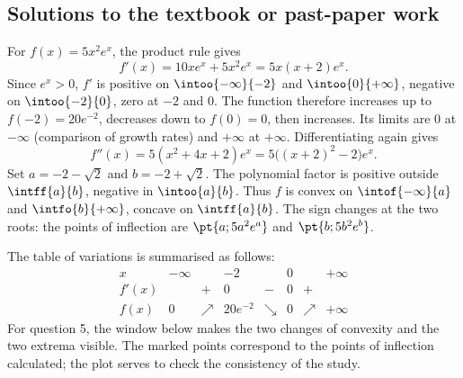 \subsection{Solutions to the textbook or past-paper work}For $f(x)=5x^2e^x$, the product rule gives
\[f'(x)=10xe^x+5x^2e^x=5x(x+2)e^x.\]
Since $e^x>0$, $f'$ is positive on $\intoo{-\infty}{-2}$ and $\intoo{0}{+\infty}$, negative on $\intoo{-2}{0}$, zero at $-2$ and $0$. The function therefore increases up to $f(-2)=20e^{-2}$, decreases down to $f(0)=0$, then increases. Its limits are $0$ at $-\infty$ (comparison of growth rates) and $+\infty$ at $+\infty$.
Differentiating again gives
\[f''(x)=5(x^2+4x+2)e^x=5\bigl((x+2)^2-2\bigr)e^x.\]
Set $a=-2-\sqrt2$ and $b=-2+\sqrt2$. The polynomial factor is positive outside $\intff{a}{b}$, negative in $\intoo{a}{b}$. Thus $f$ is convex on $\intof{-\infty}{a}$ and $\intfo{b}{+\infty}$, concave on $\intff{a}{b}$. The sign changes at the two roots: the points of inflection are $\pt{a;5a^2e^a}$ and $\pt{b;5b^2e^b}$.\par The table of variations is summarised as follows:
\[\begin{array}{c|ccccccc}x&-\infty&&-2&&0&&+\infty\\\hline f'(x)&&+&0&-&0&+&\\\hline f(x)&0&\nearrow&20e^{-2}&\searrow&0&\nearrow&+\infty\end{array}\]
For question 5, the window below makes the two changes of convexity and the two extrema visible. The marked points correspond to the points of inflection calculated; the plot serves to check the consistency of the study.
\begin{center}\end{center}

\fi


